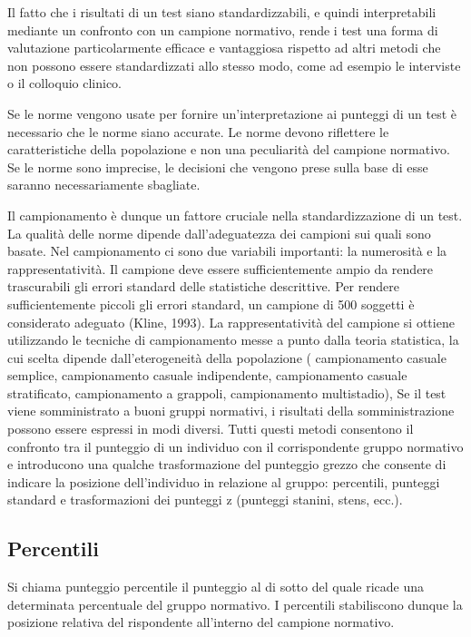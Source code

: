 Il fatto che i risultati di un test siano standardizzabili, e quindi interpretabili mediante un confronto con un campione normativo, rende i test una forma di valutazione particolarmente efficace e vantaggiosa rispetto ad altri metodi che non possono essere standardizzati allo stesso modo, come ad esempio
le interviste o 
il colloquio clinico.

Se le norme vengono usate per fornire un'interpretazione ai punteggi di un test è necessario che le norme siano accurate.
    Le norme devono riflettere le caratteristiche della popolazione e non una peculiarità del campione normativo.
      Se le norme sono imprecise, le decisioni che vengono prese sulla base di esse saranno necessariamente sbagliate.

 Il campionamento è dunque un fattore cruciale nella standardizzazione di un test.
     La qualità delle norme dipende dall'adeguatezza dei campioni sui quali sono basate.
   Nel campionamento ci sono due variabili importanti:
  la numerosità e 
la rappresentatività.
Il campione deve essere sufficientemente ampio da rendere trascurabili gli errori standard delle statistiche descrittive.
     Per rendere sufficientemente piccoli gli errori standard, un campione di 500 soggetti è considerato adeguato (Kline, 1993).
La rappresentatività del campione si ottiene utilizzando le tecniche di campionamento messe a punto dalla teoria statistica, la cui scelta dipende dall'eterogeneità della popolazione (
campionamento casuale semplice, 
    campionamento casuale indipendente,
    campionamento casuale stratificato,
    campionamento a grappoli,
    campionamento multistadio),
 Se il test viene somministrato a buoni gruppi normativi, i risultati della somministrazione possono essere espressi in modi diversi.
     Tutti questi metodi consentono il confronto tra il punteggio di un individuo con il corrispondente gruppo normativo e introducono una qualche trasformazione del punteggio grezzo che consente di indicare la posizione dell'individuo in relazione al gruppo:
percentili, punteggi standard  e trasformazioni dei punteggi z (punteggi stanini, stens, ecc.).

\subsection{Percentili}

Si chiama punteggio percentile il punteggio al di sotto del quale ricade una determinata percentuale del gruppo normativo. I percentili stabiliscono dunque la posizione relativa del rispondente all'interno del campione normativo.

